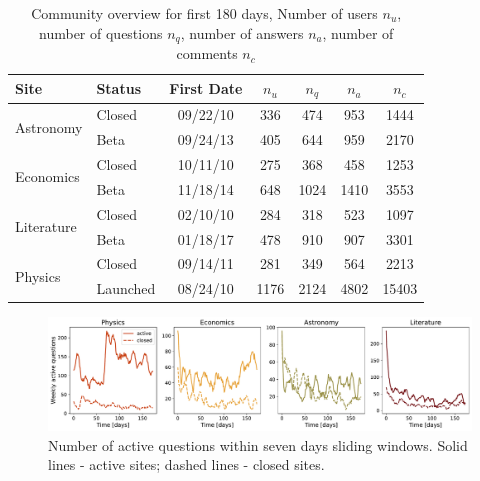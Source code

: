 \begin{table}[h]
	\centering
	\caption[Community overview for first 180 days.]{Community overview for first 180 days, Number of users $n_u$, number of questions $n_q$, number of answers $n_a$, number of comments $n_c$}
	\label{tab:site-info}
	\begin{tabular}{llccccc}
		\toprule
		Site                 & Status                           & First Date                     & $n_u$                    & $n_q$                & $n_a$                  & $n_c$ \\ \hline
		\multirow{2}{*}{Astronomy}  & \multicolumn{1}{l|}{Closed}      & \multicolumn{1}{c|}{09/22/10} & \multicolumn{1}{c|}{336}  & \multicolumn{1}{c|}{474}  & \multicolumn{1}{c|}{953}  & 1444     \\
		& \multicolumn{1}{l|}{Beta} & \multicolumn{1}{c|}{09/24/13} & \multicolumn{1}{c|}{405}  & \multicolumn{1}{c|}{644}  & \multicolumn{1}{c|}{959}  & 2170     \\ \hline
		\multirow{2}{*}{Economics}  & \multicolumn{1}{l|}{Closed}      & \multicolumn{1}{c|}{10/11/10} & \multicolumn{1}{c|}{275}  & \multicolumn{1}{c|}{368}  & \multicolumn{1}{c|}{458}  & 1253     \\
		& \multicolumn{1}{l|}{Beta} & \multicolumn{1}{c|}{11/18/14} & \multicolumn{1}{c|}{648}  & \multicolumn{1}{c|}{1024} & \multicolumn{1}{c|}{1410} & 3553     \\ \hline
		\multirow{2}{*}{Literature} & \multicolumn{1}{l|}{Closed}      & \multicolumn{1}{c|}{02/10/10} & \multicolumn{1}{c|}{284}  & \multicolumn{1}{c|}{318}  & \multicolumn{1}{c|}{523}  & 1097     \\
		& \multicolumn{1}{l|}{Beta} & \multicolumn{1}{c|}{01/18/17} & \multicolumn{1}{c|}{478}  & \multicolumn{1}{c|}{910}  & \multicolumn{1}{c|}{907}  & 3301     \\ \hline
		\multirow{2}{*}{Physics}    & \multicolumn{1}{l|}{Closed}      & \multicolumn{1}{c|}{09/14/11} & \multicolumn{1}{c|}{281}  & \multicolumn{1}{c|}{349}  & \multicolumn{1}{c|}{564}  & 2213     \\
		& \multicolumn{1}{l|}{Launched}    & \multicolumn{1}{c|}{08/24/10} & \multicolumn{1}{c|}{1176} & \multicolumn{1}{c|}{2124} & \multicolumn{1}{c|}{4802} & 15403    \\
		\bottomrule
	\end{tabular}
\end{table}


\begin{figure}
	\centering
	\includegraphics[width=\linewidth]{figures/stackexchange/active_questions.pdf}
	\caption[Number of active questions within seven days sliding windows]{Number of active questions within seven days sliding windows. Solid lines - active sites; dashed lines - closed sites.}
	\label{fig:active_questions}
\end{figure}

